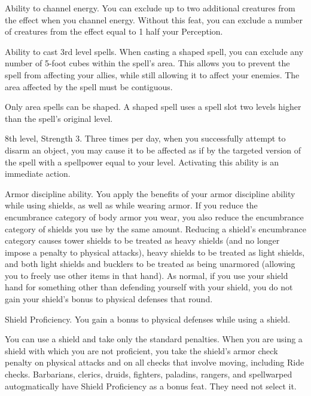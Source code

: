 \featpres
Ability to channel energy.
\featben You can exclude up to two additional creatures from the effect when you channel energy.
Without this feat, you can exclude a number of creatures from the effect equal to 1 \add half your Perception.

\featpre Ability to cast 3rd level spells.
\featben When casting a shaped spell, you can exclude any number of 5-foot cubes within the spell's area.
This allows you to prevent the spell from affecting your allies, while still allowing it to affect your enemies.
The area affected by the spell must be contiguous.

Only area spells can be shaped.
A shaped spell uses a spell slot two levels higher than the spell's original level.

\featpres 8th level, Strength 3.
\featben Three times per day, when you successfully attempt to disarm an object, you may cause it to be affected as if by the targeted version of the  spell with a spellpower equal to your level.
Activating this ability is an immediate action.

\featpre Armor discipline ability.
\featben You apply the benefits of your armor discipline ability while using shields, as well as while wearing armor.
If you reduce the encumbrance category of body armor you wear, you also reduce the encumbrance category of shields you use by the same amount.
Reducing a shield's encumbrance category causes tower shields to be treated as heavy shields (and no longer impose a  penalty to physical attacks), heavy shields to be treated as light shields, and both light shields and bucklers to be treated as being unarmored (allowing you to freely use other items in that hand).
As normal, if you use your shield hand for something other than defending yourself with your shield, you do not gain your shield's bonus to physical defenses that round.

\featpre Shield Proficiency.
\featben You gain a  bonus to physical defenses while using a shield.

\featben You can use a shield and take only the standard penalties.
When you are using a shield with which you are not proficient, you take the shield's armor check penalty on physical attacks and on all checks that involve moving, including Ride checks.
Barbarians, clerics, druids, fighters, paladins, rangers, and spellwarped autogmatically have Shield Proficiency as a bonus feat.
They need not select it.

